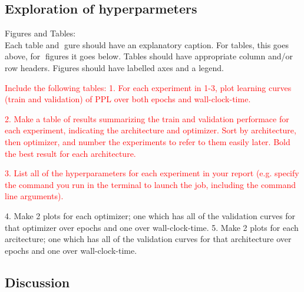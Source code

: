 


\subsection{Exploration of hyperparmeters}

Figures and Tables:\\
Each table and gure should have an explanatory caption. 
For tables, this goes above, for figures it goes below. 
Tables should have appropriate column and/or row headers.
Figures should have labelled axes and a legend. 

\textcolor{red}{Include the following tables:
1. For each experiment in 1-3, plot learning curves (train and validation) of PPL over both
epochs and wall-clock-time.}

\textcolor{red}{2. Make a table of results summarizing the train and validation performace for each experiment,
	indicating the architecture and optimizer. Sort by architecture, then optimizer, and number
	the experiments to refer to them easily later. Bold the best result for each architecture.}

\textcolor{red}{3. List all of the hyperparameters for each experiment in your report (e.g. specify the command
you run in the terminal to launch the job, including the command line arguments).}

4. Make 2 plots for each optimizer; one which has all of the validation curves for that optimizer
over epochs and one over wall-clock-time.
5. Make 2 plots for each arcitecture; one which has all of the validation curves for that architecture
over epochs and one over wall-clock-time.
\subsection{Discussion}
